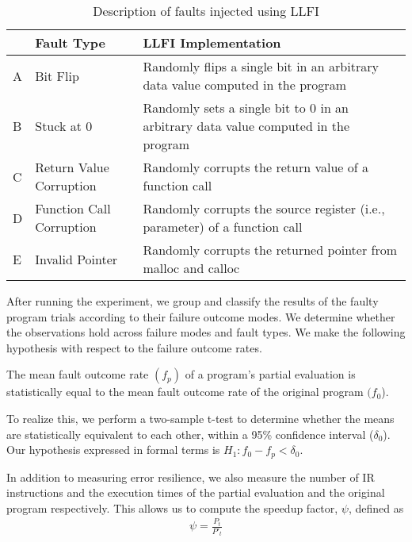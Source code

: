 \begin{table}[htbp]
\small{
\begin{center}
    \begin{tabular}{|p{0.1cm}|p{2.4cm}|p{5cm}|}
    \hline
     & \textbf{Fault Type} & \textbf{LLFI Implementation} \\ \hline
    A & Bit Flip & Randomly flips a single bit in an arbitrary data value computed in the program  \\ \hline
    B & Stuck at 0 & Randomly sets a single bit to 0 in an arbitrary data value computed in the program  \\ \hline
    C & Return Value Corruption & Randomly corrupts the return value of a function call \\ \hline
    D & Function Call Corruption & Randomly corrupts the source register (i.e., parameter) of a function call \\ \hline
    E & Invalid Pointer & Randomly corrupts the returned pointer from malloc and calloc\\ \hline
    \hline
    \end{tabular}
    \end{center}
    }
    \caption{Description of faults injected using LLFI}
    \label{tab:faulttypes}
\end{table}
 

After running the experiment, we group and classify the results of the faulty program trials according to their failure outcome modes.
We determine whether the observations hold across failure modes and fault types. 
We make the following hypothesis with respect to the failure outcome rates.

\begin{hyp}
  \label{hyp:hypothesis}
The mean fault outcome rate $(f_p)$ of a program's partial evaluation is statistically equal to the mean fault outcome rate of the original program $(f_0$).
\end{hyp}

To realize this, we perform a two-sample t-test to determine whether the means are statistically equivalent to each other, within a 95\% confidence interval ($\delta_0$).
Our hypothesis expressed in formal terms is $H_1: f_0 - f_p < \delta_0 $.

In addition to measuring error resilience, we also measure the number of IR instructions and the execution times of the partial evaluation and the original program respectively.
This allows us to compute the speedup factor, $\psi$, defined as
\begin{align*}
\psi = \frac{P_t}{P'_t}
\end{align*}

